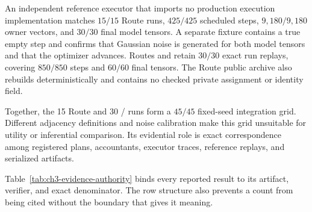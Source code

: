 An independent reference executor that imports no production execution
implementation matches \(15/15\) Route \RouteA{} runs, \(425/425\) scheduled
steps, \(9{,}180/9{,}180\) owner vectors, and \(30/30\) final model tensors.  A
separate fixture contains a true empty step and confirms that Gaussian noise is
generated for both model tensors and that the optimizer advances.  Routes
\RouteP{} and \RouteF{} retain \(30/30\) exact run replays, covering \(850/850\)
steps and \(60/60\) final tensors.  The Route \RouteA{} public archive also
rebuilds deterministically and contains no checked private assignment or identity
field.

Together, the 15 Route \RouteA{} and 30 \RouteP/\RouteF{} runs form a
\(45/45\) fixed-seed integration grid.  Different adjacency definitions and
noise calibration make this grid unsuitable for utility or inferential comparison.
Its evidential role is exact correspondence among registered plans, accountants,
executor traces, reference replays, and serialized artifacts.

Table~\ref{tab:ch3-evidence-authority} binds every reported result to its artifact,
verifier, and exact denominator.  The row structure also prevents a count from
being cited without the boundary that gives it meaning.

